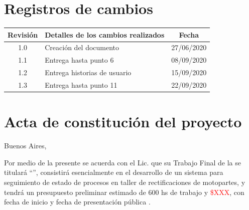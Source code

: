 \documentclass[11pt]{charter}
\begin{document}
\maketitle
\thispagestyle{empty}
\pagebreak


\thispagestyle{empty}
{\setlength{\parskip}{0pt}
\tableofcontents{}
}
\pagebreak


\section{Registros de cambios}
\label{sec:registro}


\begin{table}[ht]
\label{tab:registro}
\centering
\begin{tabularx}{\linewidth}{@{}|c|X|c|@{}}
\hline
\rowcolor[HTML]{C0C0C0} 
Revisión & \multicolumn{1}{c|}{\cellcolor[HTML]{C0C0C0}Detalles de los cambios realizados} & Fecha      \\ \hline
1.0      & Creación del documento                                          & 27/06/2020 \\ \hline
1.1      & Entrega hasta punto 6                                           & 08/09/2020 \\ \hline
1.2      & Entrega historias de usuario										& 15/09/2020    \\ \hline
1.3	     & Entrega hasta punto 11										& 22/09/2020    \\ \hline
\end{tabularx}
\end{table}

\pagebreak



\section{Acta de constitución del proyecto}
\label{sec:acta}

\begin{flushright}
Buenos Aires, \fechaInicioName
\end{flushright}

\vspace{2cm}

Por medio de la presente se acuerda con el Lic. \authorname\hspace{1px} que su Trabajo Final de la \degreename\hspace{1px} se titulará ``\ttitle'', consistirá esencialmente en el desarrollo de un sistema para seguimiento de estado de procesos en taller de rectificaciones de motopartes, y tendrá un presupuesto preliminar estimado de 600 hs de trabajo y \textcolor{red}{\$XXX}, con fecha de inicio \fechaInicioName\hspace{1px} y fecha de presentación pública \fechaFinalName.
\end{document}
